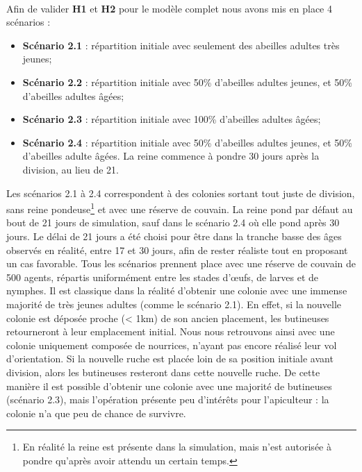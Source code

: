 			\paragraph{}
			
			Afin de valider \textbf{H1} et \textbf{H2} pour le modèle complet nous avons mis en place 4 scénarios :			
			\begin{itemize}
					\item \textbf{Scénario 2.1} : répartition initiale avec seulement des abeilles adultes très jeunes;
					\item \textbf{Scénario 2.2} : répartition initiale avec 50\% d'abeilles adultes jeunes, et 50\% d'abeilles adultes âgées;
					\item \textbf{Scénario 2.3} : répartition initiale avec 100\% d'abeilles adultes âgées;
					\item \textbf{Scénario 2.4} : répartition initiale avec 50\% d'abeilles adultes jeunes, et 50\% d'abeilles adulte âgées. La reine commence à pondre 30 jours après la division, au lieu de 21.
			\end{itemize}
			
			Les scénarios 2.1 à 2.4 correspondent à des colonies sortant tout juste de division, sans reine pondeuse\footnote{En réalité la reine est présente dans la simulation, mais n'est autorisée à pondre qu'après avoir attendu un certain temps.} et avec une réserve de couvain. La reine pond par défaut au bout de 21 jours de simulation, sauf dans le scénario 2.4 où elle pond après 30 jours. Le délai de 21 jours a été choisi pour être dans la tranche basse des âges observés en réalité, entre 17 et 30 jours, afin de rester réaliste tout en proposant un cas favorable. Tous les scénarios prennent place avec une réserve de couvain de 500 agents, répartis uniformément entre les stades d'œufs, de larves et de nymphes. Il est classique dans la réalité d'obtenir une colonie avec une immense majorité de très jeunes adultes (comme le scénario 2.1). En effet, si la nouvelle colonie est déposée proche (< 1km) de son ancien placement, les butineuses retourneront à leur emplacement initial. Nous nous retrouvons ainsi avec une colonie uniquement composée de nourrices, n'ayant pas encore réalisé leur vol d'orientation. Si la nouvelle ruche est placée loin de sa position initiale avant division, alors les butineuses resteront dans cette nouvelle ruche. De cette manière il est possible d'obtenir une colonie avec une majorité de butineuses (scénario 2.3), mais l'opération présente peu d'intérêts pour l'apiculteur : la colonie n'a que peu de chance de survivre.
			
